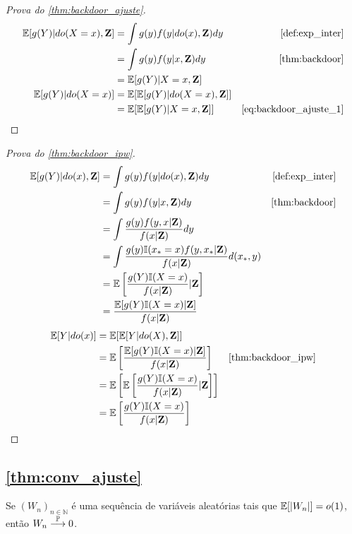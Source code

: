 \begin{proof}[Prova do \cref{thm:backdoor_ajuste}]
 \begin{align}
  \label{eq:backdoor_ajuste_1}
  \E[g(Y)|do(X=x),\Z]
  &= \int g(y) f(y|do(x),\Z) dy 
  & \text{\cref{def:exp_inter}} \nonumber \\
  &= \int g(y) f(y|x, \Z)dy 
  & \text{\cref{thm:backdoor}} \nonumber \\
  &= \E[g(Y)|X=x,\Z] \\
  \E[g(Y)|do(X=x)]
  &= \E[\E[g(Y)|do(X=x),\Z]] \nonumber \\
  &= \E[\E[g(Y)|X=x,\Z]]
  & \text{\cref{eq:backdoor_ajuste_1}} \nonumber
 \end{align}
\end{proof}

\begin{proof}[Prova do \cref{thm:backdoor_ipw}]
 \begin{align*}
  \E[g(Y)|do(x),\Z]
  &= \int g(y) f(y|do(x),\Z) dy
  & \text{\cref{def:exp_inter}} \\
  &= \int g(y) f(y|x,\Z) dy
  & \text{\cref{thm:backdoor}} \\
  &= \int \frac{g(y) f(y,x|\Z)}{f(x|\Z)} dy \\
  &= \int \frac{g(y) \I(x_* = x) f(y,x_*|\Z)}{f(x|\Z)} d(x_*, y) \\
  &= \E\left[\frac{g(Y)\I(X=x)}{f(x|\Z)}|\Z\right] \\
  &= \frac{\E[g(Y)\I(X=x)|\Z]}{f(x|\Z)}
 \end{align*}
 \begin{align*}
  \E[Y|do(x)]
  &= \E[\E[Y|do(X),\Z]] \\
  &= \E\left[\frac{\E[g(Y)\I(X=x)|\Z]}{f(x|\Z)}\right] 
  & \text{\cref{thm:backdoor_ipw}} \\
  &= \E\left[\E\left[\frac{g(Y)\I(X=x)}{f(x|\Z)}|\Z\right]\right] \\
  &= \E\left[\frac{g(Y)\I(X=x)}{f(x|\Z)}\right]
 \end{align*}
\end{proof}

\subsection{\cref{thm:conv_ajuste}}

\begin{lemma}
 \label{lemma:conv_l1_to_p}
 Se $(W_n)_{n \in \mathbb{N}}$ é uma sequência de
 variáveis aleatórias tais que ${\mathbb E}[|W_n|] = o(1)$,
 então $W_n \stackrel{{\mathbb P}}{\longrightarrow} 0$.
\end{lemma}

